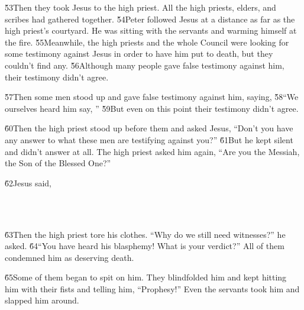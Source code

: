 \v{53}Then they took Jesus to the high priest. All the high priests, elders, and scribes had gathered together. \v{54}Peter followed Jesus at a distance as far as the high priest's courtyard. He was sitting with the servants and warming himself at the fire. \v{55}Meanwhile, the high priests and the whole Council were looking for some testimony against Jesus in order to have him put to death, but they couldn't find any. \v{56}Although many people gave false testimony against him, their testimony didn't agree.

\v{57}Then some men stood up and gave false testimony against him, saying, \v{58}``We ourselves heard him say,   '' \v{59}But even on this point their testimony didn't agree.

\v{60}Then the high priest stood up before them and asked Jesus, ``Don't you have any answer to what these men are testifying against you?'' \v{61}But he kept silent and didn't answer at all. The high priest asked him again, ``Are you the Messiah, the Son of the Blessed One?''

\v{62}Jesus said, 

\begin{poetry}
\poeml {} \\
\poemll    {} \\
\poemlll       {}
\end{poetry}

\v{63}Then the high priest tore his clothes. ``Why do we still need witnesses?'' he asked. \v{64}``You have heard his blasphemy! What is your verdict?'' All of them condemned him as deserving death.

\v{65}Some of them began to spit on him. They blindfolded him and kept hitting him with their fists and telling him, ``Prophesy!'' Even the servants took him and slapped him around.

